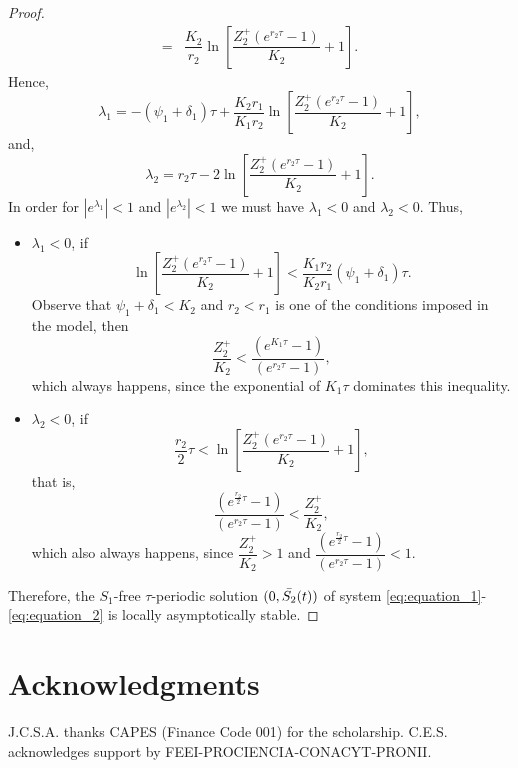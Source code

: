 \documentclass[10pt,letterpaper]{article}
\begin{document}
\begin{proof}
\begin{align}
    =&\dfrac{K_2}{r_2}\ln\left[\dfrac{Z_2^{+}\left(e^{r_2 \tau} -1\right)}{K_2} + 1\right].\nonumber
\end{align}
Hence,
\begin{equation}\label{eq:equation_83}
    \lambda_1 = -(\psi_1+\delta_1) \tau +\dfrac{K_2r_1}{K_1r_2}\ln\left[\dfrac{Z_2^{+}\left(e^{r_2 \tau} -1\right)}{K_2} + 1\right],
\end{equation}
and,
\begin{equation}\label{eq:equation_84}
    \lambda_2 = r_2 \tau -2\ln\left[\dfrac{Z_2^{+}\left(e^{r_2 \tau} -1\right)}{K_2} + 1\right].
\end{equation}
In order for $|e^{\lambda_1}|<1$ and $|e^{\lambda_2}|<1$ we must have $\lambda_1<0$ and $\lambda_2<0.$ Thus,
\begin{itemize}
    \item $\lambda_1<0$, if 
    \begin{equation}\label{eq:equation_85}
    \ln\left[\dfrac{Z_2^{+}\left(e^{r_2 \tau} -1\right)}{K_2} + 1\right] < \dfrac{K_1r_2}{K_2r_1}(\psi_1+\delta_1)\tau.
\end{equation}
Observe that $\psi_1+\delta_1 < K_2$ and $r_2<r_1$ is one of the conditions imposed in the model, then
\begin{equation}\label{eq:equation_86}
    \dfrac{Z_2^{+}}{K_2} < \dfrac{\left(e^{K_1\tau} -1\right)}{\left(e^{r_2 \tau} -1\right)},
\end{equation}
which always happens, since the exponential of $K_1 \tau$ dominates this inequality.
    \item $\lambda_2<0$, if
    \begin{equation}\label{eq:equation_87}
    \dfrac{r_2}{2} \tau < \ln\left[\dfrac{Z_2^{+}\left(e^{r_2 \tau} -1\right)}{K_2} + 1\right],
\end{equation}that is,
\begin{equation}\label{eq:equation_88}
    \dfrac{\left(e^{\frac{r_2}{2} \tau} -1\right)}{\left(e^{r_2 \tau} -1\right)}<\dfrac{Z_2^{+}}{K_2},
\end{equation}
which also always happens, since $\dfrac{Z_2^{+}}{K_2} >1$ and $\dfrac{\left(e^{\frac{r_2}{2} \tau} -1\right)}{\left(e^{r_2 \tau} -1\right)} <1$.
\end{itemize}

Therefore, the $S_1$-free $\tau$-periodic solution $(0,\Bar{S_2}(t))$ of system \eqref{eq:equation_1}-\eqref{eq:equation_2} is locally asymptotically stable.
\end{proof}

\section*{Acknowledgments}
J.C.S.A. thanks CAPES (Finance Code 001) for the scholarship. C.E.S. acknowledges support by FEEI-PROCIENCIA-CONACYT-PRONII.






\end{document}
